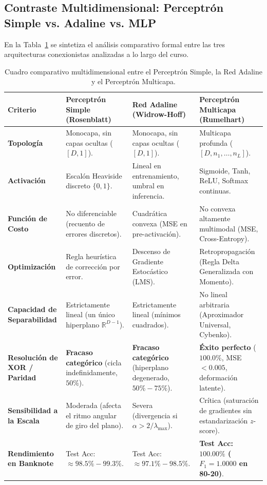 \documentclass{article}
\begin{document}
\subsection{Contraste Multidimensional: Perceptrón Simple vs. Adaline vs. MLP}

En la Tabla~\ref{tab:cuadro_comparativo_global} se sintetiza el análisis comparativo formal entre las tres arquitecturas conexionistas analizadas a lo largo del curso.

\begin{table}[H]
\centering
\caption{Cuadro comparativo multidimensional entre el Perceptrón Simple, la Red Adaline y el Perceptrón Multicapa.}
\label{tab:cuadro_comparativo_global}
\begin{tabularx}{\textwidth}{p{3.1cm} X X X}
\toprule
\textbf{Criterio} & \textbf{Perceptrón Simple (Rosenblatt)} & \textbf{Red Adaline (Widrow-Hoff)} & \textbf{Perceptrón Multicapa (Rumelhart)} \\
\midrule
\textbf{Topología} & Monocapa, sin capas ocultas ($[D, 1]$). & Monocapa, sin capas ocultas ($[D, 1]$). & Multicapa profunda ($[D, n_1, \dots, n_L]$). \\
\addlinespace
\textbf{Activación} & Escalón Heaviside discreto $\{0, 1\}$. & Lineal en entrenamiento, umbral en inferencia. & Sigmoide, Tanh, ReLU, Softmax continuas. \\
\addlinespace
\textbf{Función de Costo} & No diferenciable (recuento de errores discretos). & Cuadrática convexa (MSE en pre-activación). & No convexa altamente multimodal (MSE, Cross-Entropy). \\
\addlinespace
\textbf{Optimización} & Regla heurística de corrección por error. & Descenso de Gradiente Estocástico (LMS). & Retropropagación (Regla Delta Generalizada con Momento). \\
\addlinespace
\textbf{Capacidad de Separabilidad} & Estrictamente lineal (un único hiperplano $\mathbb{R}^{D-1}$). & Estrictamente lineal (mínimos cuadrados). & No lineal arbitraria (Aproximador Universal, Cybenko). \\
\addlinespace
\textbf{Resolución de XOR / Paridad} & \textbf{Fracaso categórico} (cicla indefinidamente, $50\%$). & \textbf{Fracaso categórico} (hiperplano degenerado, $50\%-75\%$). & \textbf{Éxito perfecto} ($100.0\%$, MSE $< 0.005$, deformación latente). \\
\addlinespace
\textbf{Sensibilidad a la Escala} & Moderada (afecta el ritmo angular de giro del plano). & Severa (divergencia si $\alpha > 2/\lambda_{\max}$). & Crítica (saturación de gradientes sin estandarización $z$-score). \\
\addlinespace
\textbf{Rendimiento en Banknote} & Test Acc: $\approx 98.5\% - 99.3\%$. & Test Acc: $\approx 97.1\% - 98.5\%$. & \textbf{Test Acc: $100.00\%$ ($F_1 = 1.0000$ en 80-20)}. \\
\bottomrule
\end{tabularx}
\end{table}
\end{document}
